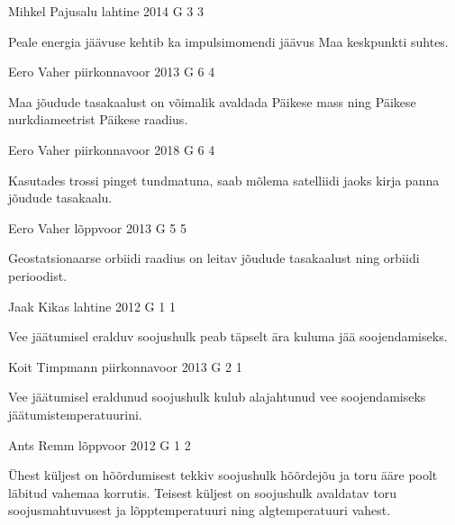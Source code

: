 \documentclass[11pt]{article}
\begin{document}
{%
{Mihkel Pajusalu} %
{lahtine} %
{2014} %
{G 3} %
{3} %
{

\ifHint
Peale energia jäävuse kehtib ka impulsimomendi jäävus Maa keskpunkti suhtes.
\fi
}

{Eero Vaher} %
{piirkonnavoor} %
{2013} %
{G 6} %
{4} %
{

\ifHint
Maa jõudude tasakaalust on võimalik avaldada Päikese mass ning Päikese nurkdiameetrist Päikese raadius.
\fi
}

{Eero Vaher} %
{piirkonnavoor} %
{2018} %
{G 6} %
{4} %
{

\ifHint
Kasutades trossi pinget tundmatuna, saab mõlema satelliidi jaoks kirja panna jõudude tasakaalu.
\fi
}

{Eero Vaher} %
{lõppvoor} %
{2013} %
{G 5} %
{5} %
{

\ifHint
Geostatsionaarse orbiidi raadius on leitav jõudude tasakaalust ning orbiidi perioodist.
\fi
}

{Jaak Kikas} %
{lahtine} %
{2012} %
{G 1} %
{1} %
{

\ifHint
Vee jäätumisel eralduv soojushulk peab täpselt ära kuluma jää soojendamiseks.
\fi
}

{Koit Timpmann} %
{piirkonnavoor} %
{2013} %
{G 2} %
{1} %
{

\ifHint
Vee jäätumisel eraldunud soojushulk kulub alajahtunud vee soojendamiseks jäätumistemperatuurini.
\fi
}

{Ants Remm} %
{lõppvoor} %
{2012} %
{G 1} %
{2} %
{

\ifHint
Ühest küljest on hõõrdumisest tekkiv soojushulk hõõrdejõu ja toru ääre poolt läbitud vahemaa korrutis. Teisest küljest on soojushulk avaldatav toru soojusmahtuvusest ja lõpptemperatuuri ning algtemperatuuri vahest.
\fi
}

}
\end{document}
